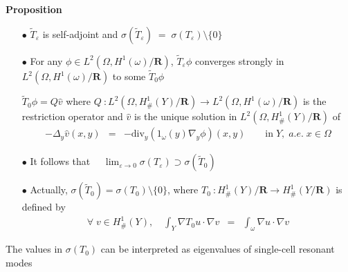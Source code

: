 \documentclass[mathserif,9pt]{beamer}
\def\e{{\varepsilon}}
\def\ds{\displaystyle}
\def\R{\mathbf R}
\begin{document}
\begin{frame}
\small{

{\bf Proposition}
\medskip

\begin{itemize}
\item[$\bullet$]
$\tilde{T}_\e$ is self-adjoint and \quad
$\sigma(\tilde{T}_\e) \;=\; \sigma(T_\e) \setminus \{0\}$
\bigskip

\item[$\bullet$]
For any $\phi \in L^2(\Omega, H^1(\omega)/\R)$, $\tilde{T}_\e \phi$
\textcolor{b_bruz}{converges strongly} in $L^2(\Omega, H^1(\omega)/\R)$ to some $\tilde{T}_0 \phi$
\medskip

$\tilde{T}_0 \phi = Q \hat{v}$ where 
$Q~: L^2(\Omega, H^1_\#(Y)/\R) \longrightarrow L^2(\Omega, H^1(\omega)/\R)$
is the restriction operator and $\hat{v}$ is the unique solution in 
$L^2(\Omega, H^1_\#(Y)/\R)$ of
\textcolor{b_bruz}{
\begin{eqnarray*}
- \Delta_y \hat{v}(x,y) &=&
- \textrm{div}_y(1_\omega(y) \nabla_y \phi)(x,y)
\quad\quad \textrm{in}\; Y, \;a.e. \;x \in \Omega
\end{eqnarray*}}

\item[$\bullet$] It follows that
\textcolor{b_bruz}{
$\quad \lim_{\e \to 0} \sigma(T_\e) \supset \sigma(\tilde{T}_0)$}
\bigskip

\item[$\bullet$] Actually, $\sigma(\tilde{T}_0) = \sigma(T_0) \setminus\{0\}$, 
where $T_0~: H^1_\#(Y)/\R \longrightarrow H^1_\#(Y/\R)$ is defined by
\textcolor{b_bruz}{
\begin{eqnarray*}
\forall\; v \in H^1_\#(Y), \quad
\ds\int_Y \nabla T_0 u \cdot \nabla v
&=&
\ds\int_\omega \nabla u \cdot \nabla v
\end{eqnarray*}}
\end{itemize}
The values in $\sigma(T_0)$ can be interpreted 
as eigenvalues of single-cell resonant modes
}
\end{frame}
\end{document}
